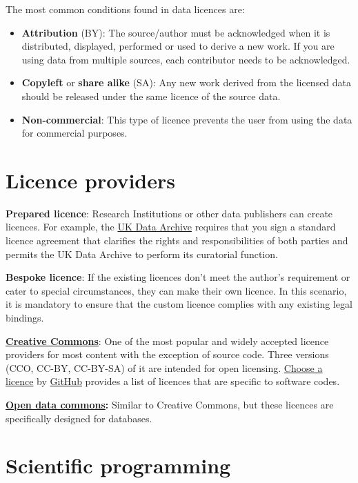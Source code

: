 \documentclass[
]{book}
\providecommand{\tightlist}{%
  \setlength{\itemsep}{0pt}\setlength{\parskip}{0pt}}
\begin{document}
The most common conditions found in data licences are:

\begin{itemize}
\tightlist
\item
  \textbf{Attribution} (BY): The source/author must be acknowledged when it is distributed, displayed, performed or used to derive a new work. If you are using data from multiple sources, each contributor needs to be acknowledged.
\item
  \textbf{Copyleft} or \textbf{share alike} (SA): Any new work derived from the licensed data should be released under the same licence of the source data.
\item
  \textbf{Non-commercial}: This type of licence prevents the user from using the data for commercial purposes.
\end{itemize}

\hypertarget{licence-providers}{%
\section{Licence providers}\label{licence-providers}}

\textbf{Prepared licence}: Research Institutions or other data publishers can create licences. For example, the \href{https://www.data-archive.ac.uk/d/1QbEbEi0v_mnprVG2sfFdzJ-vYVqv4GijnIadOWkrbFE/edit}{UK Data Archive} requires that you sign a standard licence agreement that clarifies the rights and responsibilities of both parties and permits the UK Data Archive to perform its curatorial function.

\textbf{Bespoke licence}: If the existing licences don't meet the author's requirement or cater to special circumstances, they can make their own licence. In this scenario, it is mandatory to ensure that the custom licence complies with any existing legal bindings.

\href{https://creativecommons.org/}{\textbf{Creative Commons}}: One of the most popular and widely accepted licence providers for most content with the exception of source code. Three versions (CCO, CC-BY, CC-BY-SA) of it are intended for open licensing. \href{https://choosealicense.com/licenses/}{Choose a licence} by \href{https://github.com/}{GitHub} provides a list of licences that are specific to software codes.

\href{https://opendatacommons.org/}{\textbf{Open data commons}}\textbf{:} Similar to Creative Commons, but these licences are specifically designed for databases.

\hypertarget{scientific-programming}{%
\section{Scientific programming}\label{scientific-programming}}
\end{document}
